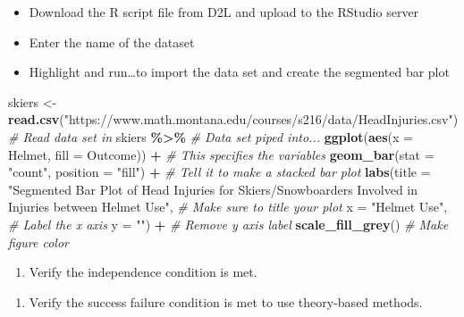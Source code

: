 \documentclass[
]{report}
\newenvironment{Shaded}{\begin{snugshade}}{\end{snugshade}}
\newcommand{\AttributeTok}[1]{\textcolor[rgb]{0.13,0.29,0.53}{#1}}
\newcommand{\CommentTok}[1]{\textcolor[rgb]{0.56,0.35,0.01}{\textit{#1}}}
\newcommand{\FunctionTok}[1]{\textcolor[rgb]{0.13,0.29,0.53}{\textbf{#1}}}
\newcommand{\NormalTok}[1]{#1}
\newcommand{\OtherTok}[1]{\textcolor[rgb]{0.56,0.35,0.01}{#1}}
\newcommand{\SpecialCharTok}[1]{\textcolor[rgb]{0.81,0.36,0.00}{\textbf{#1}}}
\newcommand{\StringTok}[1]{\textcolor[rgb]{0.31,0.60,0.02}{#1}}
\providecommand{\tightlist}{%
  \setlength{\itemsep}{0pt}\setlength{\parskip}{0pt}}
\begin{document}
\begin{itemize}
\item
  Download the R script file from D2L and upload to the RStudio server
\item
  Enter the name of the dataset
\item
  Highlight and run\ldots to import the data set and create the segmented bar plot
\end{itemize}

\begin{Shaded}
\begin{Highlighting}[]
\NormalTok{skiers }\OtherTok{\textless{}{-}} \FunctionTok{read.csv}\NormalTok{(}\StringTok{"https://www.math.montana.edu/courses/s216/data/HeadInjuries.csv"}\NormalTok{) }\CommentTok{\# Read data set in}
\NormalTok{skiers }\SpecialCharTok{\%\textgreater{}\%} \CommentTok{\# Data set piped into...}
  \FunctionTok{ggplot}\NormalTok{(}\FunctionTok{aes}\NormalTok{(}\AttributeTok{x =}\NormalTok{ Helmet, }\AttributeTok{fill =}\NormalTok{ Outcome)) }\SpecialCharTok{+}   \CommentTok{\# This specifies the variables}
  \FunctionTok{geom\_bar}\NormalTok{(}\AttributeTok{stat =} \StringTok{"count"}\NormalTok{, }\AttributeTok{position =} \StringTok{"fill"}\NormalTok{) }\SpecialCharTok{+}  \CommentTok{\# Tell it to make a stacked bar plot}
  \FunctionTok{labs}\NormalTok{(}\AttributeTok{title =} \StringTok{"Segmented Bar Plot of Head Injuries for Skiers/Snowboarders}
\StringTok{       Involved in Injuries between Helmet Use"}\NormalTok{,  }\CommentTok{\# Make sure to title your plot}
       \AttributeTok{x =} \StringTok{"Helmet Use"}\NormalTok{,   }\CommentTok{\# Label the x axis}
       \AttributeTok{y =} \StringTok{""}\NormalTok{) }\SpecialCharTok{+}  \CommentTok{\# Remove y axis label}
  \FunctionTok{scale\_fill\_grey}\NormalTok{()  }\CommentTok{\# Make figure color}
\end{Highlighting}
\end{Shaded}

\begin{enumerate}
\def\labelenumi{\arabic{enumi}.}
\tightlist
\item
  Verify the independence condition is met.
\end{enumerate}

\vspace{0.6in}

\begin{enumerate}
\def\labelenumi{\arabic{enumi}.}
\setcounter{enumi}{1}
\tightlist
\item
  Verify the success failure condition is met to use theory-based methods.
\end{enumerate}
\end{document}
